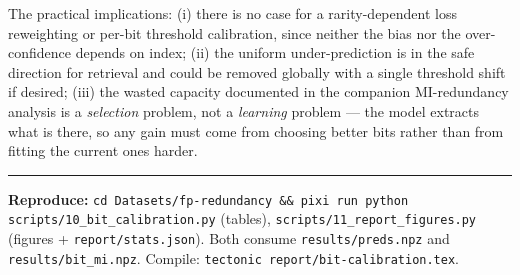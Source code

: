 \documentclass[11pt,a4paper]{article}
\begin{document}
The practical implications: (i) there is no case for a rarity-dependent loss reweighting or
per-bit threshold calibration, since neither the bias nor the over-confidence depends on index;
(ii) the uniform under-prediction is in the safe direction for retrieval and could be removed
globally with a single threshold shift if desired; (iii) the wasted capacity documented in the
companion MI-redundancy analysis is a \emph{selection} problem, not a \emph{learning} problem ---
the model extracts what is there, so any gain must come from choosing better bits rather than from
fitting the current ones harder.

\vspace{1em}
\hrule
\vspace{0.5em}
{\footnotesize
\textbf{Reproduce:}
\texttt{cd Datasets/fp-redundancy \&\& pixi run python scripts/10\_bit\_calibration.py} (tables),
\texttt{scripts/11\_report\_figures.py} (figures + \texttt{report/stats.json}).
Both consume \texttt{results/preds.npz} and \texttt{results/bit\_mi.npz}.
Compile: \texttt{tectonic report/bit-calibration.tex}.
}
\end{document}

